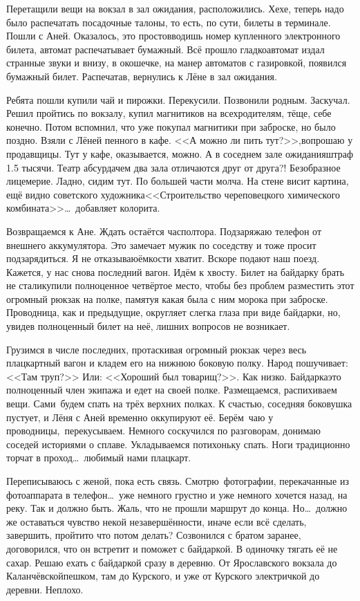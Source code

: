 Перетащили вещи на вокзал в зал ожидания, расположились. Хе\sdash хе, теперь надо было распечатать посадочные талоны, то есть, по сути, билеты в терминале. Пошли с Аней. Оказалось, это просто\mdash вводишь номер купленного электронного билета, автомат распечатывает бумажный. Всё прошло гладко\mdash автомат издал странные звуки и внизу, в окошечке, на манер автоматов с газировкой, появился бумажный билет. Распечатав, вернулись к Лёне в зал ожидания. 

Ребята пошли купили чай и пирожки. Перекусили. Позвонили родным. Заскучал. Решил пройтись по вокзалу, купил магнитиков на всех\mdash родителям, тёще, себе конечно. Потом вспомнил, что уже покупал магнитики при заброске, но было поздно. Взяли с Лёней пенного в кафе. <<А можно ли пить тут?>>,\mdash вопрошаю у продавщицы. Тут у кафе, оказывается, можно. А в соседнем зале ожидания\mdash штраф 1.5 тысячи. Театр абсурда\mdash чем два зала отличаются друг от друга?! Безобразное лицемерие. Ладно, сидим тут. По большей части молча. На стене висит картина, ещё видно советского художника\mdash <<Строительство череповецкого химического комбината>>\ldots~добавляет колорита. 

Возвращаемся к Ане. Ждать остаётся час\sdash полтора. Подзаряжаю телефон от внешнего аккумулятора. Это замечает мужик по соседству и тоже просит подзарядиться. Я не отказываю\mdash ёмкости хватит. Вскоре подают наш поезд. Кажется, у нас снова последний вагон. Идём к хвосту. Билет на байдарку брать не стали\mdash купили полноценное четвёртое место, чтобы без проблем разместить этот огромный рюкзак на полке, памятуя какая была с ним морока при заброске. Проводница, как и предыдущие, округляет слегка глаза при виде байдарки, но, увидев полноценный билет на неё, лишних вопросов не возникает.
 
Грузимся в числе последних, протаскивая огромный рюкзак через весь плацкартный вагон и кладем его на нижнюю боковую полку. Народ пошучивает: <<Там труп?>> Или: <<Хороший был товарищ?>>. Как низко. Байдарка\mdash это полноценный член экипажа и едет на своей полке. Размещаемся, распихиваем вещи. Сами~будем спать на трёх верхних полках. К счастью, соседняя боковушка пустует, и Лёня с Аней временно оккупируют её. Берём~чаю у проводницы,~перекусываем. Немного соскучился по разговорам, донимаю соседей историями о сплаве. Укладываемся потихоньку спать. Ноги традиционно торчат в проход\ldots~любимый нами плацкарт.

Переписываюсь с женой, пока есть связь. Смотрю~фотографии, перекачанные из фотоаппарата в телефон\ldots~уже немного грустно и уже немного хочется назад, на реку. Так и должно быть. Жаль, что не прошли маршрут до конца. Но\ldots~должно же оставаться чувство некой незавершённости, иначе если всё сделать, завершить, пройти\mdash то что потом делать? Созвонился с братом заранее, договорился, что он встретит и поможет с байдаркой. В одиночку тягать её не сахар. Решаю ехать с байдаркой сразу в деревню. От Ярославского вокзала до Каланчёвской\mdash пешком, там до Курского, и уже от Курского электричкой до деревни. Неплохо. 

